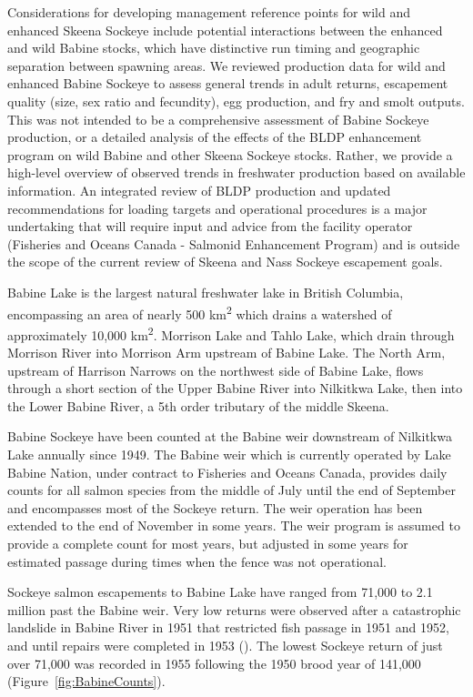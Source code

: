 \documentclass[french,11pt]{book}
\begin{document}
Considerations for developing management reference points for wild and enhanced Skeena Sockeye include potential interactions between the enhanced and wild Babine stocks, which have distinctive run timing and geographic separation between spawning areas. We reviewed production data for wild and enhanced Babine Sockeye to assess general trends in adult returns, escapement quality (size, sex ratio and fecundity), egg production, and fry and smolt outputs. This was not intended to be a comprehensive assessment of Babine Sockeye production, or a detailed analysis of the effects of the BLDP enhancement program on wild Babine and other Skeena Sockeye stocks. Rather, we provide a high-level overview of observed trends in freshwater production based on available information. An integrated review of BLDP production and updated recommendations for loading targets and operational procedures is a major undertaking that will require input and advice from the facility operator (Fisheries and Oceans Canada - Salmonid Enhancement Program) and is outside the scope of the current review of Skeena and Nass Sockeye escapement goals.

\label{babine-sockeye-stocks}

Babine Lake is the largest natural freshwater lake in British Columbia, encompassing an area of nearly 500 km\textsuperscript{2} which drains a watershed of approximately 10,000 km\textsuperscript{2}. Morrison Lake and Tahlo Lake, which drain through Morrison River into Morrison Arm upstream of Babine Lake. The North Arm, upstream of Harrison Narrows on the northwest side of Babine Lake, flows through a short section of the Upper Babine River into Nilkitkwa Lake, then into the Lower Babine River, a 5th order tributary of the middle Skeena.

Babine Sockeye have been counted at the Babine weir downstream of Nilkitkwa Lake annually since 1949. The Babine weir which is currently operated by Lake Babine Nation, under contract to Fisheries and Oceans Canada, provides daily counts for all salmon species from the middle of July until the end of September and encompasses most of the Sockeye return. The weir operation has been extended to the end of November in some years. The weir program is assumed to provide a complete count for most years, but adjusted in some years for estimated passage during times when the fence was not operational.

Sockeye salmon escapements to Babine Lake have ranged from 71,000 to 2.1 million past the Babine weir. Very low returns were observed after a catastrophic landslide in Babine River in 1951 that restricted fish passage in 1951 and 1952, and until repairs were completed in 1953 (). The lowest Sockeye return of just over 71,000 was recorded in 1955 following the 1950 brood year of 141,000 (Figure~\ref{fig:BabineCounts}).
\end{document}
